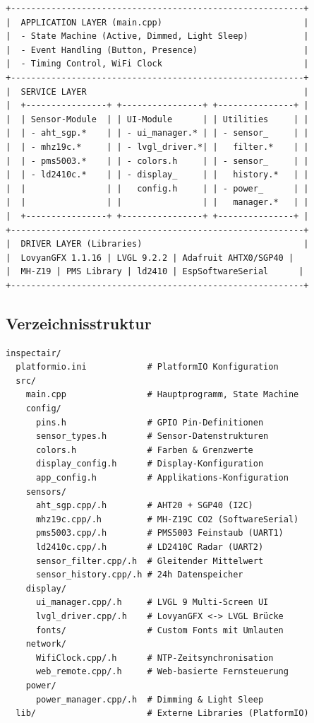 \documentclass[a4paper,11pt]{article}
\begin{document}
\begin{lstlisting}[language={},basicstyle=\ttfamily\footnotesize]
+----------------------------------------------------------+
|  APPLICATION LAYER (main.cpp)                            |
|  - State Machine (Active, Dimmed, Light Sleep)           |
|  - Event Handling (Button, Presence)                     |
|  - Timing Control, WiFi Clock                            |
+----------------------------------------------------------+
|  SERVICE LAYER                                           |
|  +----------------+ +----------------+ +---------------+ |
|  | Sensor-Module  | | UI-Module      | | Utilities     | |
|  | - aht_sgp.*    | | - ui_manager.* | | - sensor_     | |
|  | - mhz19c.*     | | - lvgl_driver.*| |   filter.*    | |
|  | - pms5003.*    | | - colors.h     | | - sensor_     | |
|  | - ld2410c.*    | | - display_     | |   history.*   | |
|  |                | |   config.h     | | - power_      | |
|  |                | |                | |   manager.*   | |
|  +----------------+ +----------------+ +---------------+ |
+----------------------------------------------------------+
|  DRIVER LAYER (Libraries)                                |
|  LovyanGFX 1.1.16 | LVGL 9.2.2 | Adafruit AHTX0/SGP40 |
|  MH-Z19 | PMS Library | ld2410 | EspSoftwareSerial      |
+----------------------------------------------------------+
\end{lstlisting}

\subsection{Verzeichnisstruktur}

\begin{lstlisting}[language={},basicstyle=\ttfamily\footnotesize]
inspectair/
  platformio.ini            # PlatformIO Konfiguration
  src/
    main.cpp                # Hauptprogramm, State Machine
    config/
      pins.h                # GPIO Pin-Definitionen
      sensor_types.h        # Sensor-Datenstrukturen
      colors.h              # Farben & Grenzwerte
      display_config.h      # Display-Konfiguration
      app_config.h          # Applikations-Konfiguration
    sensors/
      aht_sgp.cpp/.h        # AHT20 + SGP40 (I2C)
      mhz19c.cpp/.h         # MH-Z19C CO2 (SoftwareSerial)
      pms5003.cpp/.h        # PMS5003 Feinstaub (UART1)
      ld2410c.cpp/.h        # LD2410C Radar (UART2)
      sensor_filter.cpp/.h  # Gleitender Mittelwert
      sensor_history.cpp/.h # 24h Datenspeicher
    display/
      ui_manager.cpp/.h     # LVGL 9 Multi-Screen UI
      lvgl_driver.cpp/.h    # LovyanGFX <-> LVGL Brücke
      fonts/                # Custom Fonts mit Umlauten
    network/
      WifiClock.cpp/.h      # NTP-Zeitsynchronisation
      web_remote.cpp/.h     # Web-basierte Fernsteuerung
    power/
      power_manager.cpp/.h  # Dimming & Light Sleep
  lib/                      # Externe Libraries (PlatformIO)
\end{lstlisting}
\end{document}
